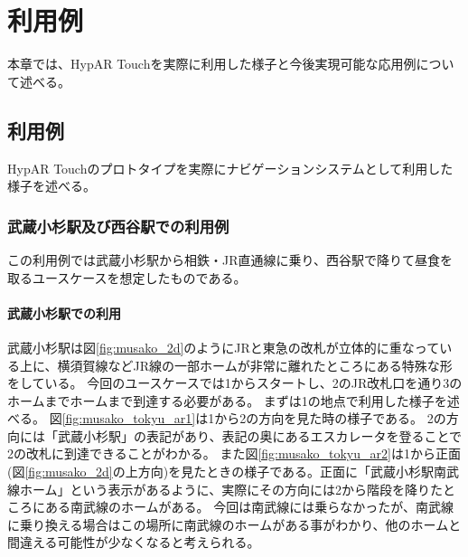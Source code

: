 \chapter{利用例}
\label{chap:usage}

本章では、HypAR Touchを実際に利用した様子と今後実現可能な応用例について述べる。

\newpage

\section{利用例}
HypAR Touchのプロトタイプを実際にナビゲーションシステムとして利用した様子を述べる。

\subsection{武蔵小杉駅及び西谷駅での利用例}
この利用例では武蔵小杉駅から相鉄・JR直通線に乗り、西谷駅で降りて昼食を取るユースケースを想定したものである。

\subsubsection{武蔵小杉駅での利用}
武蔵小杉駅は図\ref{fig:musako_2d}のようにJRと東急の改札が立体的に重なっている上に、横須賀線などJR線の一部ホームが非常に離れたところにある特殊な形をしている。
今回のユースケースでは\textcircled{\scriptsize{1}}からスタートし、\textcircled{\scriptsize{2}}のJR改札口を通り\textcircled{\scriptsize{3}}のホームまでホームまで到達する必要がある。
まずは\textcircled{\scriptsize{1}}の地点で利用した様子を述べる。
図\ref{fig:musako_tokyu_ar1}は\textcircled{\scriptsize{1}}から\textcircled{\scriptsize{2}}の方向を見た時の様子である。
\textcircled{\scriptsize{2}}の方向には「武蔵小杉駅」の表記があり、表記の奥にあるエスカレータを登ることで\textcircled{\scriptsize{2}}の改札に到達できることがわかる。
また図\ref{fig:musako_tokyu_ar2}は\textcircled{\scriptsize{1}}から正面(図\ref{fig:musako_2d}の上方向)を見たときの様子である。正面に「武蔵小杉駅南武線ホーム」という表示があるように、実際にその方向には\textcircled{\scriptsize{2}}から階段を降りたところにある南武線のホームがある。
今回は南武線には乗らなかったが、南武線に乗り換える場合はこの場所に南武線のホームがある事がわかり、他のホームと間違える可能性が少なくなると考えられる。

